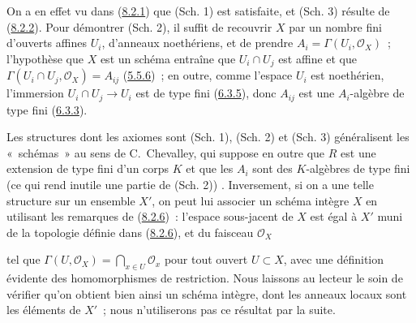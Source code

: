 On a en effet vu dans (\hyperref[I.8.2.1-fr]{8.2.1}) que (Sch. 1) est
satisfaite, et (Sch. 3) résulte de (\hyperref[I.8.2.2-fr]{8.2.2}). Pour
démontrer (Sch. 2), il suffit de recouvrir $X$ par un nombre fini d'ouverts
affines $U_i$, d'anneaux noethériens, et de prendre
$A_i=\Gamma(U_i,\mathscr{O}_X)$~; l'hypothèse que $X$ est un schéma entraîne
que $U_i\cap U_j$ est affine et que
$\Gamma(U_i\cap U_j,\mathscr{O}_X)=A_{ij}$
(\hyperref[I.5.5.6-fr]{5.5.6})~; en outre, comme l'espace $U_i$ est
noethérien, l'immersion $U_i\cap U_j\to U_i$ est de type fini
(\hyperref[I.6.3.5-fr]{6.3.5}), donc $A_{ij}$ est une $A_i$-algèbre de type
fini (\hyperref[I.6.3.3-fr]{6.3.3}).

\begin{env}[8.3.2]
\label{I.8.3.2-fr}
Les structures dont les axiomes sont (Sch. 1), (Sch. 2) et (Sch. 3)
généralisent les «~schémas~» au sens de C.~Chevalley, qui suppose en outre que
$R$ est une extension de type fini d'un corps $K$ et que les $A_i$ sont des
$K$-algèbres de type fini (ce qui rend inutile une partie de (Sch. 2))
\cite{I-1}. Inversement, si on a une telle structure sur un ensemble $X'$,
on peut lui associer un schéma intègre $X$ en utilisant les remarques de
(\hyperref[I.8.2.6-fr]{8.2.6})~: l'espace sous-jacent de $X$ est égal à $X'$
muni de la topologie définie dans (\hyperref[I.8.2.6-fr]{8.2.6}), et du
faisceau $\mathscr{O}_X$

tel que $\Gamma(U,\mathscr{O}_X)=\bigcap_{x\in U}\mathscr{O}_x$ pour tout
ouvert $U\subset X$, avec une définition évidente des homomorphismes de
restriction. Nous laissons au lecteur le soin de vérifier qu'on obtient bien
ainsi un schéma intègre, dont les anneaux locaux sont les éléments de $X'$~;
nous n'utiliserons pas ce résultat par la suite.
\end{env}
